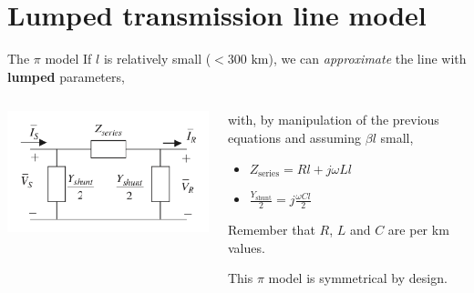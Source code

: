 \section{Lumped transmission line model}
\begin{frame}{The $\pi$ model}
If $l$ is relatively small ($< 300 \text{ km}$), we can \textit{approximate} the line with \textbf{lumped} parameters,
\begin{columns}
    \begin{column}{0.55\textwidth}
    \begin{center}
        \includegraphics[width=\textwidth]{images/pi_1.png}
    \end{center}
    \end{column}
    \begin{column}{0.45\textwidth}
    with, by manipulation of the previous equations and assuming $\beta l$ small,
    \begin{itemize}
        \item $Z_{\text{series}} = R l +  j \omega L l$
        \item $\frac{Y_{\text{shunt}}}{2} = j \frac{\omega C l}{2}$
    \end{itemize}
    
    Remember that $R$, $L$ and $C$ are per km values.

    This $\pi$ model is symmetrical by design.
    \end{column}
\end{columns}

    
\end{frame}

